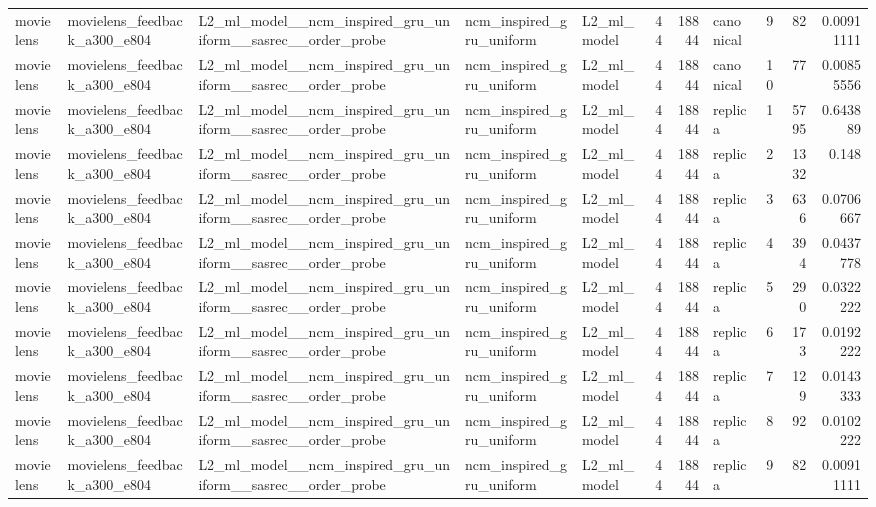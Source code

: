 \begin{table}[htbp!]
\begin{tabular}{lllllrrlrrr}
movielens & movielens\_feedback\_a300\_e804 & L2\_ml\_model\_\_ncm\_inspired\_gru\_uniform\_\_sasrec\_\_order\_probe & ncm\_inspired\_gru\_uniform & L2\_ml\_model & 44 & 18844 & canonical & 9 & 82 & 0.00911111 \\
movielens & movielens\_feedback\_a300\_e804 & L2\_ml\_model\_\_ncm\_inspired\_gru\_uniform\_\_sasrec\_\_order\_probe & ncm\_inspired\_gru\_uniform & L2\_ml\_model & 44 & 18844 & canonical & 10 & 77 & 0.00855556 \\
movielens & movielens\_feedback\_a300\_e804 & L2\_ml\_model\_\_ncm\_inspired\_gru\_uniform\_\_sasrec\_\_order\_probe & ncm\_inspired\_gru\_uniform & L2\_ml\_model & 44 & 18844 & replica & 1 & 5795 & 0.643889 \\
movielens & movielens\_feedback\_a300\_e804 & L2\_ml\_model\_\_ncm\_inspired\_gru\_uniform\_\_sasrec\_\_order\_probe & ncm\_inspired\_gru\_uniform & L2\_ml\_model & 44 & 18844 & replica & 2 & 1332 & 0.148 \\
movielens & movielens\_feedback\_a300\_e804 & L2\_ml\_model\_\_ncm\_inspired\_gru\_uniform\_\_sasrec\_\_order\_probe & ncm\_inspired\_gru\_uniform & L2\_ml\_model & 44 & 18844 & replica & 3 & 636 & 0.0706667 \\
movielens & movielens\_feedback\_a300\_e804 & L2\_ml\_model\_\_ncm\_inspired\_gru\_uniform\_\_sasrec\_\_order\_probe & ncm\_inspired\_gru\_uniform & L2\_ml\_model & 44 & 18844 & replica & 4 & 394 & 0.0437778 \\
movielens & movielens\_feedback\_a300\_e804 & L2\_ml\_model\_\_ncm\_inspired\_gru\_uniform\_\_sasrec\_\_order\_probe & ncm\_inspired\_gru\_uniform & L2\_ml\_model & 44 & 18844 & replica & 5 & 290 & 0.0322222 \\
movielens & movielens\_feedback\_a300\_e804 & L2\_ml\_model\_\_ncm\_inspired\_gru\_uniform\_\_sasrec\_\_order\_probe & ncm\_inspired\_gru\_uniform & L2\_ml\_model & 44 & 18844 & replica & 6 & 173 & 0.0192222 \\
movielens & movielens\_feedback\_a300\_e804 & L2\_ml\_model\_\_ncm\_inspired\_gru\_uniform\_\_sasrec\_\_order\_probe & ncm\_inspired\_gru\_uniform & L2\_ml\_model & 44 & 18844 & replica & 7 & 129 & 0.0143333 \\
movielens & movielens\_feedback\_a300\_e804 & L2\_ml\_model\_\_ncm\_inspired\_gru\_uniform\_\_sasrec\_\_order\_probe & ncm\_inspired\_gru\_uniform & L2\_ml\_model & 44 & 18844 & replica & 8 & 92 & 0.0102222 \\
movielens & movielens\_feedback\_a300\_e804 & L2\_ml\_model\_\_ncm\_inspired\_gru\_uniform\_\_sasrec\_\_order\_probe & ncm\_inspired\_gru\_uniform & L2\_ml\_model & 44 & 18844 & replica & 9 & 82 & 0.00911111 \\

\end{tabular}
\end{table}
